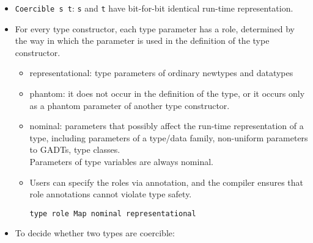 \begin{itemize}
\item \verb|Coercible s t|: \verb|s| and \verb|t| have bit-for-bit identical
  run-time representation.
\item For every type constructor, each type parameter has a role, determined by
  the way in which the parameter is used in the definition of the type constructor.
  \begin{itemize}
  \item representational: type parameters of ordinary newtypes and datatypes
  \item phantom: it does not occur in the definition of the type, or it occurs
    only as a phantom parameter of another type constructor.
  \item nominal: parameters that possibly affect the run-time representation of
    a type, including parameters of a type/data family, non-uniform parameters
    to GADTs, type classes.\\
    Parameters of type variables are always nominal.
  \item Users can specify the roles via annotation, and the compiler ensures that
    role annotations cannot violate type safety.
    \begin{verbatim}
type role Map nominal representational
    \end{verbatim}
  \end{itemize}
\item To decide whether two types are coercible:
\end{itemize}
